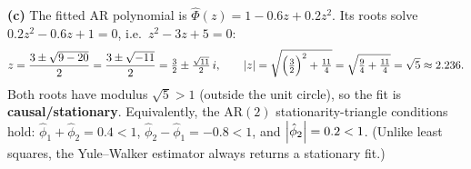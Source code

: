 \documentclass[11pt]{article}
\begin{document}
\textbf{(c)} The fitted AR polynomial is $\hat\Phi(z)=1-0.6z+0.2z^{2}$. Its roots solve $0.2z^{2}-0.6z+1=0$, i.e.\ $z^{2}-3z+5=0$:
\[
z=\frac{3\pm\sqrt{9-20}}{2}=\frac{3\pm\sqrt{-11}}{2}=\tfrac32\pm\tfrac{\sqrt{11}}{2}\,i,
\qquad
\left\lvert z \right\rvert=\sqrt{\Bigl(\tfrac32\Bigr)^{2}+\tfrac{11}{4}}=\sqrt{\tfrac{9}{4}+\tfrac{11}{4}}=\sqrt5\approx2.236 .
\]
Both roots have modulus $\sqrt5>1$ (outside the unit circle), so the fit is \textbf{causal/stationary}. Equivalently, the $\mathrm{AR}(2)$ stationarity-triangle conditions hold: $\hat\phi_1+\hat\phi_2=0.4<1$, $\hat\phi_2-\hat\phi_1=-0.8<1$, and $\left\lvert \hat\phi_2 \right\rvert=0.2<1$. (Unlike least squares, the Yule--Walker estimator always returns a stationary fit.)
\end{document}
